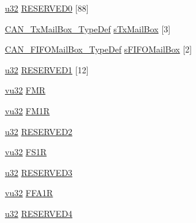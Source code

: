 \begin{DoxyCompactItemize}
\item 
\hyperlink{agilefox_2library_2inc_2stm32f10x__type_8h_a2caf5cd7bcdbe1eefa727f44ffb10bac}{u32} \hyperlink{struct_c_a_n___type_def_a19ce3ccfa72098de17c9691b253db419}{R\+E\+S\+E\+R\+V\+E\+D0} \mbox{[}88\mbox{]}
\item 
\hyperlink{struct_c_a_n___tx_mail_box___type_def}{C\+A\+N\+\_\+\+Tx\+Mail\+Box\+\_\+\+Type\+Def} \hyperlink{struct_c_a_n___type_def_ab78f764584ec276cd36960d4f4fcdc1a}{s\+Tx\+Mail\+Box} \mbox{[}3\mbox{]}
\item 
\hyperlink{struct_c_a_n___f_i_f_o_mail_box___type_def}{C\+A\+N\+\_\+\+F\+I\+F\+O\+Mail\+Box\+\_\+\+Type\+Def} \hyperlink{struct_c_a_n___type_def_a90ff90723c0ec4ae8a7028d4f3b024f4}{s\+F\+I\+F\+O\+Mail\+Box} \mbox{[}2\mbox{]}
\item 
\hyperlink{agilefox_2library_2inc_2stm32f10x__type_8h_a2caf5cd7bcdbe1eefa727f44ffb10bac}{u32} \hyperlink{struct_c_a_n___type_def_aaf1fe7198450752c477cea150ef0cc39}{R\+E\+S\+E\+R\+V\+E\+D1} \mbox{[}12\mbox{]}
\item 
\hyperlink{agilefox_2library_2inc_2stm32f10x__type_8h_a6e2761f0a1011f84ed96b946f2c8a563}{vu32} \hyperlink{struct_c_a_n___type_def_affc66d56e31f75c2c511f268500c9821}{F\+MR}
\item 
\hyperlink{agilefox_2library_2inc_2stm32f10x__type_8h_a6e2761f0a1011f84ed96b946f2c8a563}{vu32} \hyperlink{struct_c_a_n___type_def_a613fdea10a52ee0afaa210f84dc1ebb9}{F\+M1R}
\item 
\hyperlink{agilefox_2library_2inc_2stm32f10x__type_8h_a2caf5cd7bcdbe1eefa727f44ffb10bac}{u32} \hyperlink{struct_c_a_n___type_def_a062eb8e75039049321c3ced7bae3c153}{R\+E\+S\+E\+R\+V\+E\+D2}
\item 
\hyperlink{agilefox_2library_2inc_2stm32f10x__type_8h_a6e2761f0a1011f84ed96b946f2c8a563}{vu32} \hyperlink{struct_c_a_n___type_def_a4da36d695b16468f85259dbf5a8655f5}{F\+S1R}
\item 
\hyperlink{agilefox_2library_2inc_2stm32f10x__type_8h_a2caf5cd7bcdbe1eefa727f44ffb10bac}{u32} \hyperlink{struct_c_a_n___type_def_a3bc6588784075ca4599ae264559744df}{R\+E\+S\+E\+R\+V\+E\+D3}
\item 
\hyperlink{agilefox_2library_2inc_2stm32f10x__type_8h_a6e2761f0a1011f84ed96b946f2c8a563}{vu32} \hyperlink{struct_c_a_n___type_def_a06681971d1f64c158e9a67868440458f}{F\+F\+A1R}
\item 
\hyperlink{agilefox_2library_2inc_2stm32f10x__type_8h_a2caf5cd7bcdbe1eefa727f44ffb10bac}{u32} \hyperlink{struct_c_a_n___type_def_a8a7c737f6118430c96f410ec10b043c5}{R\+E\+S\+E\+R\+V\+E\+D4}

\end{DoxyCompactItemize}
